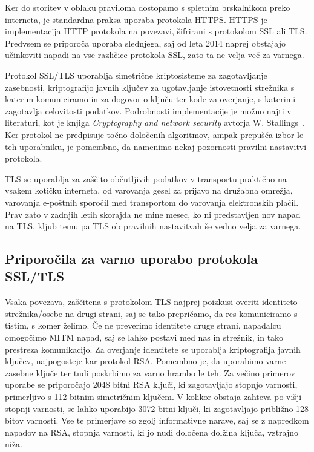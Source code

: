 \documentclass[12pt,a4paper,openany,tikz]{book}
\theoremstyle{plain}
\theoremstyle{definition}
\begin{document}
Ker do storitev v oblaku praviloma dostopamo s spletnim brskalnikom preko interneta, je standardna praksa uporaba protokola \gls{HTTPS}. \Gls{HTTPS} je implementacija HTTP protokola na povezavi, šifrirani s protokolom \gls{SSL} ali \gls{TLS}. Predvsem se priporoča uporaba slednjega, saj od leta 2014 naprej obstajajo učinkoviti napadi na vse različice protokola \gls{SSL}, zato ta ne velja več za varnega.

Protokol SSL/TLS uporablja simetrične kriptosisteme za zagotavljanje zasebnosti, kriptografijo javnih ključev za ugotavljanje istovetnosti strežnika s katerim komuniciramo in za dogovor o ključu ter kode za overjanje, s katerimi zagotavlja celovitosti podatkov. Podrobnosti implementacije je možno najti v literaturi, kot je knjiga \textit{Cryptography and network security} avtorja W. Stallings~\cite{stallings2006cryptography}. Ker protokol ne predpisuje točno določenih algoritmov, ampak prepušča izbor le teh uporabniku, je pomembno, da namenimo nekaj pozornosti pravilni nastavitvi protokola.

\Gls{TLS} se uporablja za zaščito občutljivih podatkov v transportu praktično na vsakem kotičku interneta, od varovanja gesel za prijavo na družabna omrežja, varovanja e-poštnih sporočil med transportom do varovanja elektronskih plačil. Prav zato v zadnjih letih skorajda ne mine mesec, ko ni predstavljen nov napad na \gls{TLS}, kljub temu pa \gls{TLS} ob pravilnih nastavitvah še vedno velja za varnega.

\subsection*{Priporočila za varno uporabo protokola SSL/TLS}
\label{sub:Priporočila za varno uporabo protokola SSL/TLS}

Vsaka povezava, zaščitena s protokolom TLS najprej poizkusi overiti identiteto strežnika/osebe na drugi strani, saj se tako prepričamo, da res komuniciramo s tistim, s komer želimo. Če ne preverimo identitete druge strani, napadalcu omogočimo MITM napad, saj se lahko postavi med nas in strežnik, in tako prestreza komunikacijo. Za overjanje identitete se uporablja kriptografija javnih ključev, najpogosteje kar protokol RSA. Pomembno je, da uporabimo varne zasebne ključe ter tudi poskrbimo za varno hrambo le teh. Za večino primerov uporabe se priporočajo 2048 bitni RSA ključi, ki zagotavljajo stopnjo varnosti, primerljivo s 112 bitnim simetričnim ključem. V kolikor obstaja zahteva po višji stopnji varnosti, se lahko uporabijo 3072 bitni ključi, ki zagotavljajo približno 128 bitov varnosti. Vse te primerjave so zgolj informativne narave, saj se z napredkom napadov na RSA, stopnja varnosti, ki jo nudi določena dolžina ključa, vztrajno niža.
\end{document}
